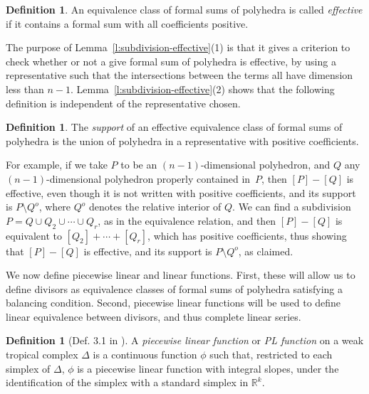 \documentclass[11pt]{amsart}
\theoremstyle{definition}
\newtheorem{defn}[thm]{Definition}
\newcommand{\defi}[1]{\emph{#1}}
\newcommand{\RR}{\mathbb R}
\begin{document}
\begin{defn}\label{d:effective-support}
An equivalence class of formal sums of polyhedra is called \defi{effective} if
it contains a formal sum with all coefficients positive.
\end{defn}

The purpose of Lemma~\ref{l:subdivision-effective}(1) is that it gives a criterion
to check whether or not a give formal sum of polyhedra is effective, by
using a representative such that the intersections between the terms all have
dimension less than $n-1$. Lemma~\ref{l:subdivision-effective}(2)
shows that the following definition is independent of the representative chosen.

\begin{defn}
The \defi{support} of
an effective equivalence class of formal sums of polyhedra is the union of
polyhedra in a representative with positive coefficients.
\end{defn}

For example, if we take $P$ to be an $(n-1)$-dimensional polyhedron, and $Q$ any
$(n-1)$-dimensional polyhedron properly contained in~$P$, then $[P]-[Q]$ is
effective, even though it is not written with positive coefficients, and its
support is $P \setminus Q^o$, where $Q^o$ denotes the relative interior of $Q$.
We can find a subdivision $P = Q \cup Q_2 \cup \cdots \cup Q_r$, as in the
equivalence relation, and then $[P] - [Q]$ is equivalent to $[Q_2] + \cdots +
[Q_r]$, which has positive coefficients, thus showing that $[P]-[Q]$ is
effective, and its support is $P \setminus Q^o$, as claimed.

We now define piecewise linear and linear functions. First, these will allow us
to define divisors as equivalence classes of formal sums of polyhedra satisfying
a balancing condition. Second, piecewise linear functions will be used to define
linear equivalence between divisors, and thus complete linear series.

\begin{defn}[Def. 3.1 in \cite{cartwright-complexes}]\label{d:pl}
A \defi{piecewise linear function} or \defi{PL function} on a weak tropical
complex $\Delta$ is a continuous function $\phi$ such that, restricted to each
simplex of $\Delta$, $\phi$ is a piecewise linear function with integral slopes,
under the identification of the simplex with a standard simplex in $\RR^k$.
\end{defn}
\end{document}
